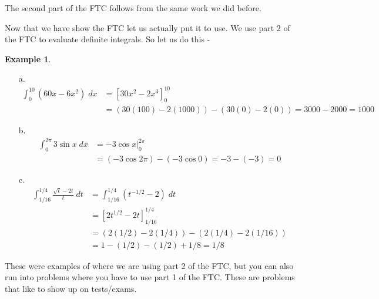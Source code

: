 \documentclass[12pt,reqno]{article}
\theoremstyle{definition}
\newtheorem*{Example}{Example}
\begin{document}
The second part of the FTC follows from the same work we did before. 


Now that we have show the FTC let us actually put it to use. We use part 2 of the FTC to evaluate definite integrals. So let us do this - 

\begin{Example}
	\begin{enumerate}
		\item[a.] \begin{align*}
			\int_{0}^{10} (60 x - 6x^2) \; dx &= \left[30 x^2 - 2 x^3\right]_{0}^{10} \\
						&= (30(100) - 2(1000)) - (30(0) - 2(0)) = 3000-2000 = 1000
		\end{align*}
	
	\item[b.] \begin{align*}
		\int_{0}^{2\pi} 3 \sin x \; dx &= \left. -3 \cos x \right|_{0}^{2\pi} \\
		&= (-3 \cos 2\pi) - (-3 \cos 0)  = -3 -(-3) = 0
	\end{align*}
	
	\item[c.] \begin{align*}
		\int_{1/16}^{1/4} \frac{\sqrt{t} - 2t}{t} \; dt &= \int_{1/16}^{1/4} (t^{-1/2} - 2)\; dt \\
		&= \left[2 t^{1/2} - 2t\right]_{1/16}^{1/4} \\
		&= (2 (1/2) - 2(1/4)) - (2(1/4) - 2(1/16)) \\
		&= 1 - (1/2) - (1/2) + 1/8 = 1/8
	\end{align*}
	\end{enumerate}
\end{Example}

These were examples of where we are using part 2 of the FTC, but you can also run into problems where you have to use part 1 of the FTC. These are problems that like to show up on tests/exams. 
\end{document}
